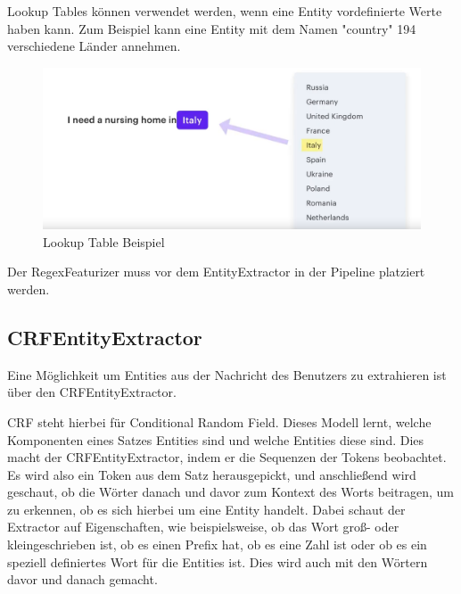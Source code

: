 Lookup Tables können verwendet werden, wenn eine Entity vordefinierte Werte haben kann.
Zum Beispiel kann eine Entity mit dem Namen "country" 194 verschiedene Länder annehmen.\cite{rasaMasterclassRegexFeaturizer, pipelineComponentsYoutube, regexFeaturizerCrf}

\begin{figure}[hbt!]
    \centering
    \includegraphics[scale=0.25]{pics/lookup-table-example}
    \caption{Lookup Table Beispiel~\cite{pipelineComponentsYoutube}}
    \label{fig:Lookup Table Beispiel}
\end{figure}

Der RegexFeaturizer muss vor dem EntityExtractor in der Pipeline platziert werden.\cite{rasaMasterclassRegexFeaturizer, pipelineComponentsYoutube, regexFeaturizerCrf}

\subsection{CRFEntityExtractor}

Eine Möglichkeit um Entities aus der Nachricht des Benutzers zu extrahieren ist über den CRFEntityExtractor.\cite{crfEntityExtractor}

CRF steht hierbei für Conditional Random Field.
Dieses Modell lernt, welche Komponenten eines Satzes Entities sind und welche Entities diese sind.\cite{crfEntityExtractor, pipelineComponentsYoutube, regexFeaturizerCrf}
\ci
Dies macht der CRFEntityExtractor, indem er die Sequenzen der Tokens beobachtet.
Es wird also ein Token aus dem Satz herausgepickt, und anschließend wird geschaut, ob die Wörter danach und davor zum Kontext des Worts beitragen, um zu erkennen, ob es sich hierbei um eine Entity handelt.
Dabei schaut der Extractor auf Eigenschaften, wie beispielsweise, ob das Wort groß- oder kleingeschrieben ist, ob es einen Prefix hat, ob es eine Zahl ist oder ob es ein speziell definiertes Wort für die Entities ist.
Dies wird auch mit den Wörtern davor und danach gemacht.\cite{crfEntityExtractor, pipelineComponentsYoutube, regexFeaturizerCrf}

